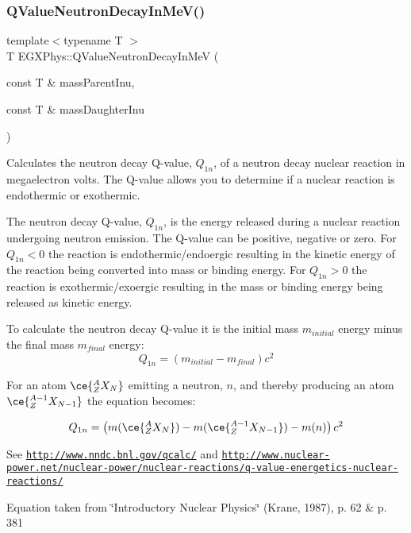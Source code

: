 \subsubsection{\texorpdfstring{Q\+Value\+Neutron\+Decay\+In\+Me\+V()}{QValueNeutronDecayInMeV()}}
{\footnotesize\ttfamily template$<$typename T $>$ \\
T E\+G\+X\+Phys\+::\+Q\+Value\+Neutron\+Decay\+In\+MeV (\begin{DoxyParamCaption}\item[{const T \&}]{mass\+Parent\+Inu,  }\item[{const T \&}]{mass\+Daughter\+Inu }\end{DoxyParamCaption})}



Calculates the neutron decay Q-\/value, $Q_{1n}$, of a neutron decay nuclear reaction in megaelectron volts. The Q-\/value allows you to determine if a nuclear reaction is endothermic or exothermic. 

The neutron decay Q-\/value, $Q_{1n}$, is the energy released during a nuclear reaction undergoing neutron emission. The Q-\/value can be positive, negative or zero. For $Q_{1n} < 0$ the reaction is endothermic/endoergic resulting in the kinetic energy of the reaction being converted into mass or binding energy. For $Q_{1n} > 0$ the reaction is exothermic/exoergic resulting in the mass or binding energy being released as kinetic energy.

To calculate the neutron decay Q-\/value it is the initial mass $m_{initial}$ energy minus the final mass $m_{final}$ energy\+: \[Q_{1n} = \left ( m_{initial}-m_{final}\right ) c^2\]

For an atom $\ce{ ^{A}_{Z}X_{N} }$ emitting a neutron, $n$, and thereby producing an atom $\ce{ ^{A-1}_{Z}X_{N-1} }$ the equation becomes\+:

\[Q_{1n} = \left ( m(\ce{ ^{A}_{Z}X_{N} }) - m(\ce{ ^{A-1}_{Z}X_{N-1} }) - m(n) \right ) c^2\]

See \href{http://www.nndc.bnl.gov/qcalc/}{\tt http\+://www.\+nndc.\+bnl.\+gov/qcalc/} and \href{http://www.nuclear-power.net/nuclear-power/nuclear-reactions/q-value-energetics-nuclear-reactions/}{\tt http\+://www.\+nuclear-\/power.\+net/nuclear-\/power/nuclear-\/reactions/q-\/value-\/energetics-\/nuclear-\/reactions/}

Equation taken from \char`\"{}\+Introductory Nuclear Physics\char`\"{} (Krane, 1987), p. 62 \& p. 381


